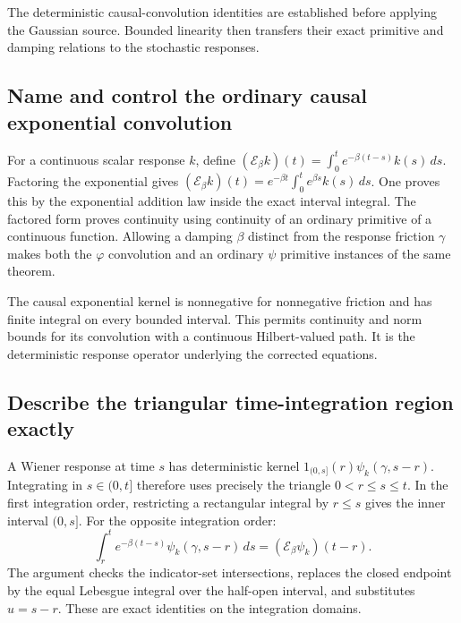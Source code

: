 \documentclass[11pt,a4paper]{report}
\begin{document}
The deterministic causal-convolution identities are established before applying the Gaussian source. Bounded linearity then transfers their exact primitive and damping relations to the stochastic responses.

\subsection{\texorpdfstring{Name and control the ordinary causal exponential convolution}{Name and control the ordinary causal exponential convolution}}
\label{report-step-KineticLangevin-KernelConvolution-lean-1}


For a continuous scalar response \(k\), define \((\mathcal E_\beta k)(t)=\int_0^t e^{-\beta(t-s)}k(s)\,ds\). Factoring the exponential gives \((\mathcal E_\beta k)(t)=e^{-\beta t}\int_0^t e^{\beta s}k(s)\,ds\). One proves this by the exponential addition law inside the exact interval integral. The factored form proves continuity using continuity of an ordinary primitive of a continuous function. Allowing a damping \(\beta\) distinct from the response friction \(\gamma\) makes both the \(\varphi\) convolution and an ordinary \(\psi\) primitive instances of the same theorem.



The causal exponential kernel is nonnegative for nonnegative friction and has finite integral on every bounded interval. This permits continuity and norm bounds for its convolution with a continuous Hilbert-valued path. It is the deterministic response operator underlying the corrected equations.

\subsection{\texorpdfstring{Describe the triangular time-integration region exactly}{Describe the triangular time-integration region exactly}}
\label{report-step-KineticLangevin-KernelConvolution-lean-2}


A Wiener response at time \(s\) has deterministic kernel \(1_{(0,s]}(r)\psi_k(\gamma,s-r)\). Integrating in \(s\in(0,t]\) therefore uses precisely the triangle \(0<r\le s\le t\). In the first integration order, restricting a rectangular integral by \(r\le s\) gives the inner interval \((0,s]\). For the opposite integration order: \[\int_r^t e^{-\beta(t-s)}\psi_k(\gamma,s-r)\,ds=(\mathcal E_\beta\psi_k)(t-r).\] The argument checks the indicator-set intersections, replaces the closed endpoint by the equal Lebesgue integral over the half-open interval, and substitutes \(u=s-r\). These are exact identities on the integration domains.
\end{document}
